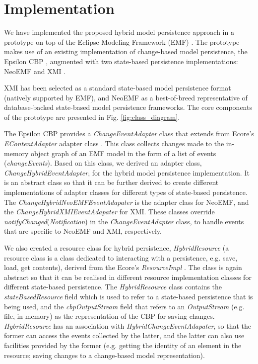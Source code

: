 \documentclass{llncs}
\begin{document}
\section{Implementation}
\label{sec:implementation}

We have implemented the proposed hybrid model persistence approach in a prototype on top of the Eclipse Modeling Framework (EMF) \cite{steinberg2008emf}. The prototype makes use of an existing implementation of change-based model persistence, the Epsilon CBP \cite{DBLP:conf/models/YohannisKP17}, augmented with two state-based persistence implementations: NeoEMF \cite{daniel2016neoemf} and XMI \cite{omg2018xmi}.

XMI has been selected as a standard state-based model persistence format (natively supported by EMF), and NeoEMF as a best-of-breed representative of database-backed state-based model persistence frameworks. The core components of the prototype are presented in Fig. \ref{fig:class_diagram}. 

The Epsilon CBP provides a \textit{ChangeEventAdapter} class \cite{DBLP:conf/models/YohannisKP17} that extends from Ecore's \textit{EContentAdapter} adapter class \cite{eclipse2018eContentAdapter}. This class collects changes made to the in-memory object graph of an EMF model in the form of a list of events (\textit{changeEvents}). Based on this class, we derived an adapter class, \textit{ChangeHybridEventAdapter}, for the hybrid model persistence implementation. It is an abstract class so that it can be further derived to create different implementations of adapter classes for different types of state-based persistence. The \textit{ChangeHybridNeoEMFEventAdapater} is the adapter class for NeoEMF, and the \textit{ChangeHybridXMIEventAdapater} for XMI. These classes override \textit{notifyChanged}(\textit{Notification}) in the \textit{ChangeEventAdapter} class, to handle events that are specific to NeoEMF and XMI, respectively.

We also created a resource class for hybrid persistence, \textit{HybridResource} (a resource class is a class dedicated to interacting with a persistence, e.g. save, load, get contents), derived from the Ecore's \textit{ResourceImpl} \cite{eclipse2018resourceImpl}. The class is again abstract so that it can be realised in different resource implementation classes for different state-based persistence. The \textit{HybridResource} class contains the \textit{stateBasedResource} field which is used to refer to a state-based persistence that is being used, and the \textit{cbpOutputStream} field that refers to an \textit{OutputStream} (e.g. file, in-memory) as the representation of the CBP for saving changes. \textit{HybridResource} has an association with \textit{HybridChangeEventAdapater}, so that the former can access the events collected by the latter, and the latter can also use facilities provided by the former (e.g. getting the identity of an element in the resource; saving changes to a change-based model representation).
\end{document}
